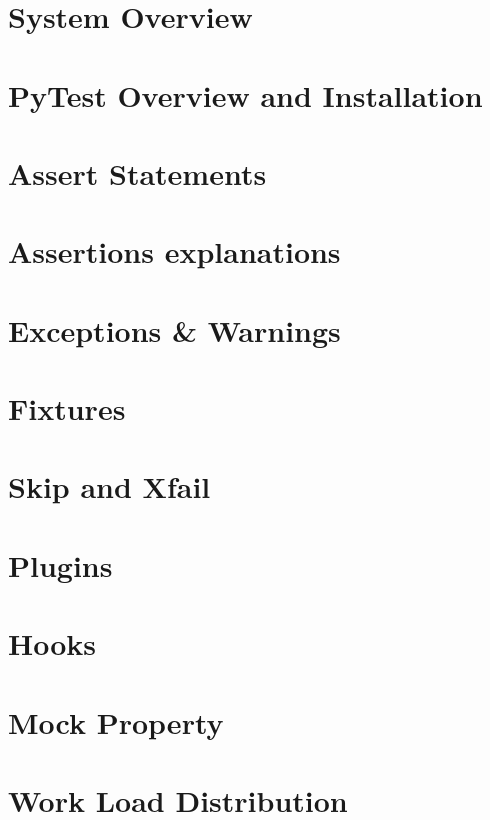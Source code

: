 \documentclass[a4paper,12pt]{article}
\begin{document}
\begin{scriptsize}
\tableofcontents
\end{scriptsize}


    
\section{System Overview}


\section{PyTest Overview and Installation}


\section{Assert Statements}


\section{Assertions explanations}
\label{sec:explainations}


\section{Exceptions \& Warnings}
\label{sec:exceptions}


\section{Fixtures}
\label{sec:fixtures}


\section{Skip and Xfail}
\label{sec:skip_xfail}


\section{Plugins}
\label{sec:plugins}


\section{Hooks}
\label{sec:hooks}


\section{Mock Property}
\label{sec:mock}


\section{Work Load Distribution}

 


\nocite{*}
\end{document}
